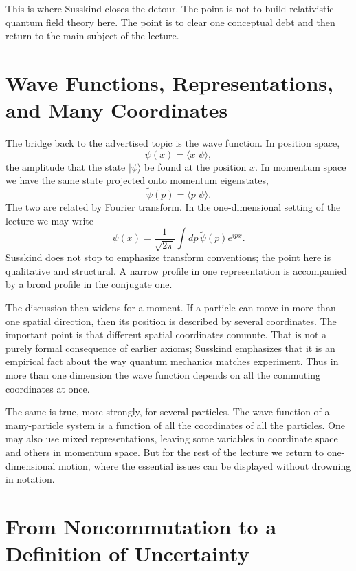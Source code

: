 This is where Susskind closes the detour. The point is not to build relativistic quantum field theory here. The point is to clear one conceptual debt and then return to the main subject of the lecture.

\section{Wave Functions, Representations, and Many Coordinates}

The bridge back to the advertised topic is the wave function. In position space,
\begin{equation}
\psi(x)=\langle x|\psi\rangle,
\end{equation}
the amplitude that the state \(|\psi\rangle\) be found at the position \(x\). In momentum space we have the same state projected onto momentum eigenstates,
\begin{equation}
\tilde{\psi}(p)=\langle p|\psi\rangle.
\end{equation}
The two are related by Fourier transform. In the one-dimensional setting of the lecture we may write
\begin{equation}
\psi(x)=\frac{1}{\sqrt{2\pi}}\int dp\,\tilde{\psi}(p)e^{ipx}.
\end{equation}
Susskind does not stop to emphasize transform conventions; the point here is qualitative and structural. A narrow profile in one representation is accompanied by a broad profile in the conjugate one.

The discussion then widens for a moment. If a particle can move in more than one spatial direction, then its position is described by several coordinates. The important point is that different spatial coordinates commute. That is not a purely formal consequence of earlier axioms; Susskind emphasizes that it is an empirical fact about the way quantum mechanics matches experiment. Thus in more than one dimension the wave function depends on all the commuting coordinates at once.

The same is true, more strongly, for several particles. The wave function of a many-particle system is a function of all the coordinates of all the particles. One may also use mixed representations, leaving some variables in coordinate space and others in momentum space. But for the rest of the lecture we return to one-dimensional motion, where the essential issues can be displayed without drowning in notation.

\section{From Noncommutation to a Definition of Uncertainty}


